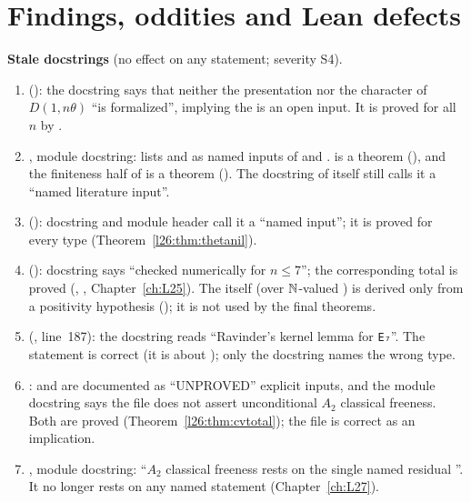 \section{Findings, oddities and Lean defects}\label{l26:sec:defects}

\begin{warning}
\textbf{Stale docstrings} (no effect on any statement; severity S4).
\begin{enumerate}
\item {} (): the docstring says that neither the presentation nor the
  character of $D(1,n\theta)$ ``is formalized'', implying the  is an open input. It is proved for all $n$ by
  .
\item {}, module docstring: lists  and  as named
  inputs of  and .  is a theorem (), and the finiteness
  half of  is a theorem (). The docstring of  itself
  still calls it a ``named literature input''.
\item {} (): docstring and module header call it a ``named input''; it is
  proved for every type (Theorem~\ref{l26:thm:thetanil}).
\item {} (): docstring says ``checked numerically for
  $n\le7$''; the corresponding total is proved (, , Chapter~\ref{ch:L25}). The
    itself (over ${\mathbb{N}}$-valued ) is derived only from a positivity hypothesis
  (); it is not used by the final theorems.
\item {} (, line~187): the docstring reads ``Ravinder's kernel lemma
  for \texttt{E₇}''. The statement is correct (it is about ); only the docstring names the wrong type.
\item {}:  and  are documented as
  ``UNPROVED'' explicit inputs, and the module docstring says the file does not assert unconditional $A_2$ classical freeness. Both
  are proved (Theorem~\ref{l26:thm:cvtotal}); the file is correct as an implication.
\item {}, module docstring: ``$A_2$ classical freeness rests on the single named residual
  ''. It no longer rests on any named statement (Chapter~\ref{ch:L27}).
\end{enumerate}
\end{warning}



